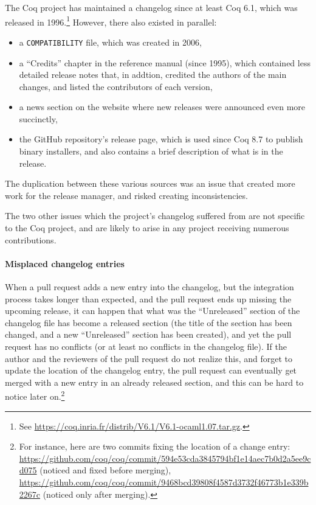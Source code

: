 The Coq project has maintained a changelog since at least Coq 6.1, which was released in 1996.\footnote{
	See \url{https://coq.inria.fr/distrib/V6.1/V6.1-ocaml1.07.tar.gz}.
}
However, there also existed in parallel:
\begin{itemize}
	\item a \verb|COMPATIBILITY| file, which was created in 2006,
	\item a ``Credits'' chapter in the reference manual (since 1995), which contained less detailed release notes that, in addtion, credited the authors of the main changes, and listed the contributors of each version,
	\item a news section on the website where new releases were announced even more succinctly,
	\item the GitHub repository's release page, which is used since Coq 8.7 to publish binary installers, and also contains a brief description of what is in the release.
\end{itemize}

The duplication between these various sources was an issue that created more work for the release manager, and risked creating inconsistencies.

The two other issues which the project's changelog suffered from are not specific to the Coq project, and are likely to arise in any project receiving numerous contributions.

\paragraph{Misplaced changelog entries}

When a pull request adds a new entry into the changelog, but the integration process takes longer than expected, and the pull request ends up missing the upcoming release, it can happen that what was the ``Unreleased'' section of the changelog file has become a released section (the title of the section has been changed, and a new ``Unreleased'' section has been created), and yet the pull request has no conflicts (or at least no conflicts in the changelog file).
If the author and the reviewers of the pull request do not realize this, and forget to update the location of the changelog entry, the pull request can eventually get merged with a new entry in an already released section, and this can be hard to notice later on.\footnote{
	For instance, here are two commits fixing the location of a change entry:
	\url{https://github.com/coq/coq/commit/594e53cda3845794bf1e14aec7b0d2a5ee9cd075} (noticed and fixed before merging),
	\url{https://github.com/coq/coq/commit/9468bcd39808f4587d3732f46773b1e339b2267c} (noticed only after merging).
}

